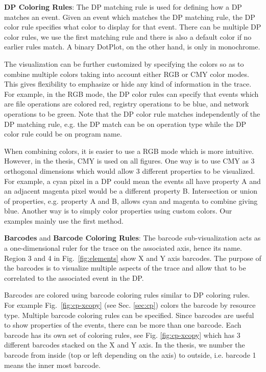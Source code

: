 {\bf DP Coloring Rules}:
The DP matching rule is used for defining how a DP matches
an event. Given an event which matches the DP matching rule,
the DP color rule specifies what color to display for that event.
There can be multiple DP color rules, we use the first matching
rule and there is also a default color if no earlier rules match.
A binary DotPlot, on the other hand, is only in monochrome.

The visualization can be further customized by specifying the colors so
as to combine multiple colors taking
into account either RGB or CMY color modes.
This gives flexibility to emphasize or hide any kind of information
in the trace.
For example, in the RGB mode, the DP color rules
can specify that events which are
file operations are colored red,
registry operations to be blue, and network operations to be green.
Note that the DP color rule matches independently of the DP matching rule,
e.g. the DP match can be on operation type while the DP color rule could be
on program name.

When combining colors, it is easier to use a RGB mode which is
more intuitive. However, in the thesis, CMY is used on all figures.
One way is to use CMY as 3 orthogonal dimensions which would allow 3 different
properties to be visualized.
For example, a cyan pixel in a DP could mean
the events all have property A and an adjacent magenta pixel
would be a different property B.
Intersection or union of properties, e.g. property A and B,
allows cyan and magenta to combine giving blue.
Another way is to simply color properties using custom colors.
Our examples mainly use the first method.

{\bf Barcodes} and {\bf Barcode Coloring Rules}:
The barcode sub-visualization
acts as a one-dimensional ruler for the trace on the associated axis, hence its name.
Region 3 and 4 in Fig.~\ref{fig:elements} show X and Y axis barcodes.
The purpose of the barcodes is to visualize multiple aspects of
the trace and allow that to be correlated to the associated event in the DP.

Barcodes are colored using
barcode coloring rules similar to DP coloring rules.
For example Fig.~\ref{fig:cp-xcopy} (see Sec. \ref{sec:cp})
colors the barcode by resource type.
Multiple barcode coloring rules can be specified.
Since barcodes are useful to show properties of the events,
there can be more than one barcode. Each barcode has its own
set of coloring rules, see Fig. \ref{fig:cp-xcopy} which has 3 different
barcodes stacked on the X and Y axis.
In the thesis, we number the barcode from inside (top or left depending
on the axis) to outside, i.e. barcode 1 means the inner most barcode.

